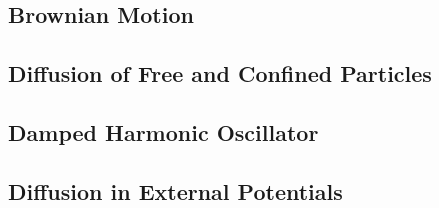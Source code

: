 \documentclass[a4paper]{article}
\theoremstyle{new}
\begin{document}
\subsection{Brownian Motion}
\subsection{Diffusion of Free and Confined Particles}
\subsection{Damped Harmonic Oscillator}
\subsection{Diffusion in External Potentials}

\appendix
\newpage
\end{document}
